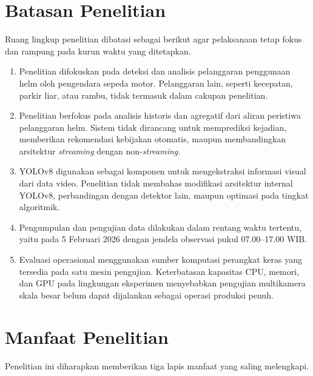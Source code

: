 \section{Batasan Penelitian}
\label{section:batasanpenelitian}

Ruang lingkup penelitian dibatasi sebagai berikut agar pelaksanaan tetap fokus dan rampung pada kurun waktu yang ditetapkan.

\begin{enumerate}
  \item Penelitian difokuskan pada deteksi dan analisis pelanggaran penggunaan helm oleh pengendara sepeda motor. Pelanggaran lain, seperti kecepatan, parkir liar, atau rambu, tidak termasuk dalam cakupan penelitian.

  \item Penelitian berfokus pada analisis historis dan agregatif dari aliran peristiwa pelanggaran helm. Sistem tidak dirancang untuk memprediksi kejadian, memberikan rekomendasi kebijakan otomatis, maupun membandingkan arsitektur \textit{streaming} dengan non-\textit{streaming}.

  \item YOLOv8 digunakan sebagai komponen untuk mengekstraksi informasi visual dari data video. Penelitian tidak membahas modifikasi arsitektur internal YOLOv8, perbandingan dengan detektor lain, maupun optimasi pada tingkat algoritmik.

  \item Pengumpulan dan pengujian data dilakukan dalam rentang waktu tertentu, yaitu pada 5 Februari 2026 dengan jendela observasi pukul 07.00--17.00 WIB.

  \item Evaluasi operasional menggunakan sumber komputasi perangkat keras yang tersedia pada satu mesin pengujian. Keterbatasan kapasitas CPU, memori, dan GPU pada lingkungan eksperimen menyebabkan pengujian multikamera skala besar belum dapat dijalankan sebagai operasi produksi penuh.
\end{enumerate}

\section{Manfaat Penelitian}
\label{section:manfaatpenelitian}

Penelitian ini diharapkan memberikan tiga lapis manfaat yang saling melengkapi.

